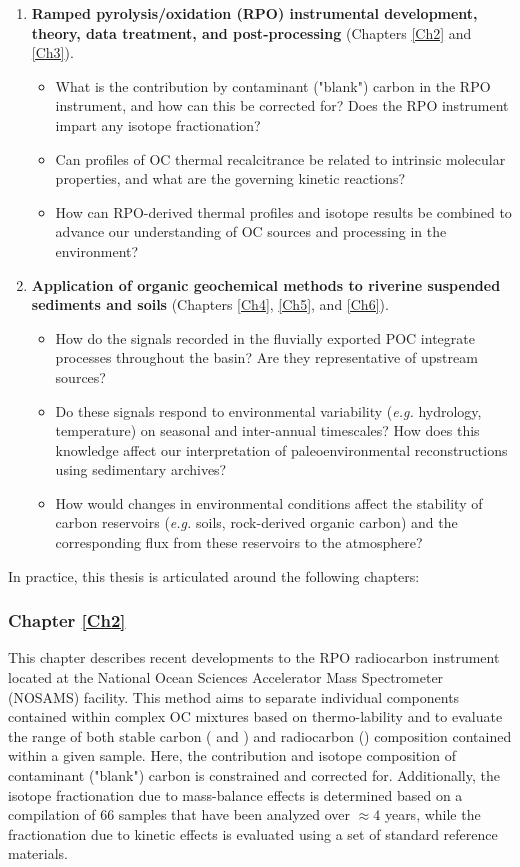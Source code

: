 \begin{enumerate}
\item \textbf{Ramped pyrolysis/oxidation (RPO) instrumental development, theory, data treatment, and post-processing} (Chapters \ref{Ch2} and \ref{Ch3}).
	\begin{itemize}
	\item What is the contribution by contaminant ("blank") carbon in the RPO instrument, and how can this be corrected for? Does the RPO instrument impart any isotope fractionation?
	\item Can profiles of OC thermal recalcitrance be related to intrinsic molecular properties, and what are the governing kinetic reactions?
	\item How can RPO-derived thermal profiles and isotope results be combined to advance our understanding of OC sources and processing in the environment?  
	\end{itemize}
\item \textbf{Application of organic geochemical methods to riverine suspended sediments and soils} (Chapters \ref{Ch4}, \ref{Ch5}, and \ref{Ch6}).
	\begin{itemize}
	\item How do the signals recorded in the fluvially exported POC integrate processes throughout the basin? Are they representative of upstream sources?
	\item Do these signals respond to environmental variability (\textit{e.g.} hydrology, temperature) on seasonal and inter-annual timescales? How does this knowledge affect our interpretation of paleoenvironmental reconstructions using sedimentary archives?
	\item How would changes in environmental conditions affect the stability of carbon reservoirs (\textit{e.g.} soils, rock-derived organic carbon) and the corresponding  flux from these reservoirs to the atmosphere?
	\end{itemize}
\end{enumerate}

In practice, this thesis is articulated around the following chapters:

\subsubsection{Chapter \ref{Ch2}}

This chapter describes recent developments to the RPO radiocarbon instrument located at the National Ocean Sciences Accelerator Mass Spectrometer (NOSAMS) facility. This method aims to separate individual components contained within complex OC mixtures based on thermo-lability and to evaluate the range of both stable carbon ( and ) and radiocarbon () composition contained within a given sample. Here, the contribution and isotope composition of contaminant ("blank") carbon is constrained and corrected for. Additionally, the isotope fractionation due to mass-balance effects is determined based on a compilation of 66 samples that have been analyzed over $\approx 4$ years, while the fractionation due to kinetic effects is evaluated using a set of standard reference materials. 

